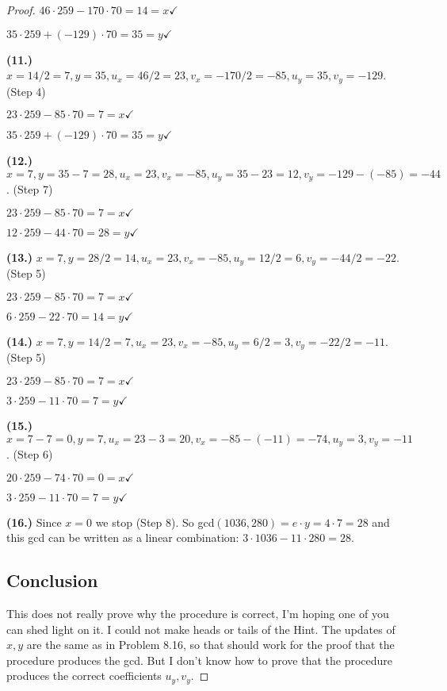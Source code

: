\documentclass[14pt]{extarticle}
\begin{document}
\begin{proof}
$46 \cdot 259 -170 \cdot 70 = 14 = x \checkmark$

$35 \cdot 259 + (-129) \cdot 70 = 35 = y \checkmark$

{\bf (11.)} $x = 14 / 2 = 7, y = 35, u_x = 46 / 2 = 23, v_x = -170 / 2 = -85, u_y = 35, v_y = -129$. (Step 4)

$23 \cdot 259 -85 \cdot 70 = 7 = x \checkmark$

$35 \cdot 259 + (-129) \cdot 70 = 35 = y \checkmark$

{\bf (12.)} $x = 7, y = 35 - 7 = 28, u_x = 23, v_x = -85, u_y = 35 - 23 = 12, v_y = -129 - (-85) = -44$. (Step 7)

$23 \cdot 259 -85 \cdot 70 = 7 = x \checkmark$

$12 \cdot 259 -44 \cdot 70 = 28 = y \checkmark$

{\bf (13.)} $x = 7, y = 28/2=14, u_x = 23, v_x = -85, u_y = 12/2=6, v_y = -44/2=-22$. (Step 5)

$23 \cdot 259 -85 \cdot 70 = 7 = x \checkmark$

$6 \cdot 259 -22 \cdot 70 = 14 = y \checkmark$

{\bf (14.)} $x = 7, y = 14/2=7, u_x = 23, v_x = -85, u_y = 6/2=3, v_y = -22/2=-11$. (Step 5)

$23 \cdot 259 -85 \cdot 70 = 7 = x \checkmark$

$3 \cdot 259 -11 \cdot 70 = 7 = y \checkmark$

{\bf (15.)} $x = 7-7=0, y = 7, u_x = 23-3=20, v_x = -85-(-11)=-74, u_y = 3, v_y = -11$. (Step 6)

$20 \cdot 259 -74 \cdot 70 = 0 = x \checkmark$

$3 \cdot 259 -11 \cdot 70 = 7 = y \checkmark$

{\bf (16.)} Since $x = 0$ we stop (Step 8). So gcd$(1036,280) = e \cdot y = 4 \cdot 7 = 28$ and this gcd can be written as a linear combination: $3\cdot 1036 - 11\cdot 280 = 28$.

\subsection{Conclusion}

This does not really prove why the procedure is correct, I'm hoping one of you can shed light on it. I could not make heads or tails of the Hint. The updates of $x,y$ are the same as in Problem 8.16, so that should work for the proof that the procedure produces the gcd. But I don't know how to prove that the procedure produces the correct coefficients $u_y, v_y$.

\end{proof}
\end{document}
